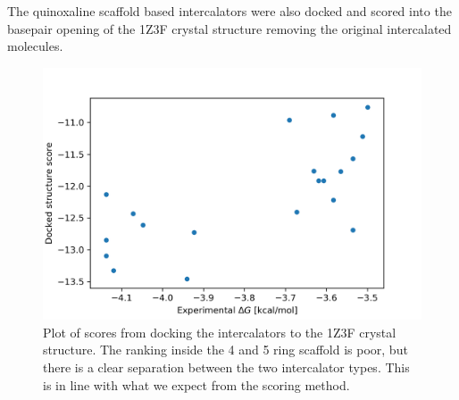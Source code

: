 The quinoxaline scaffold based intercalators were also docked and scored into the basepair opening of the 1Z3F crystal structure removing the original intercalated molecules.  

\begin{figure}
  \includegraphics[width=\columnwidth]{docking}
  \caption{Plot of scores from docking the intercalators to the 1Z3F crystal structure. The ranking inside the 4 and 5 ring scaffold is poor, but there is a clear separation between the two intercalator types. This is in line with what we expect from the scoring method.}
  \label{fig:docking}
\end{figure}





